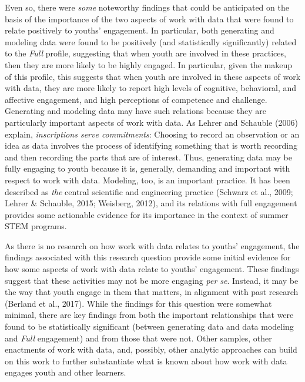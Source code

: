\documentclass[]{book}
\theoremstyle{definition}
\theoremstyle{definition}
\theoremstyle{definition}
\theoremstyle{remark}
\begin{document}
Even so, there were \emph{some} noteworthy findings that could be
anticipated on the basis of the importance of the two aspects of work
with data that were found to relate positively to youths' engagement. In
particular, both generating and modeling data were found to be
positively (and statistically significantly) related to the \emph{Full}
profile, suggesting that when youth are involved in these practices,
then they are more likely to be highly engaged. In particular, given the
makeup of this profile, this suggests that when youth are involved in
these aspects of work with data, they are more likely to report high
levels of cognitive, behavioral, and affective engagement, and high
perceptions of competence and challenge. Generating and modeling data
may have such relations because they are particularly important aspects
of work with data. As Lehrer and Schauble (2006) explain,
\emph{inscriptions serve commitments}: Choosing to record an observation
or an idea as data involves the process of identifying something that is
worth recording and then recording the parts that are of interest. Thus,
generating data may be fully engaging to youth because it is, generally,
demanding and important with respect to work with data. Modeling, too,
is an important practice. It has been described as \emph{the} central
scientific and engineering practice (Schwarz et al., 2009; Lehrer \&
Schauble, 2015; Weisberg, 2012), and its relations with full engagement
provides some actionable evidence for its importance in the context of
summer STEM programs.

As there is no research on how work with data relates to youths'
engagement, the findings associated with this research question provide
some initial evidence for how some aspects of work with data relate to
youths' engagement. These findings suggest that these activities may not
be more engaging \emph{per se}. Instead, it may be the way that youth
engage in them that matters, in alignment with past research (Berland et
al., 2017). While the findings for this question were somewhat minimal,
there are key findings from both the important relationships that were
found to be statistically significant (between generating data and data
modeling and \emph{Full} engagement) and from those that were not. Other
samples, other enactments of work with data, and, possibly, other
analytic approaches can build on this work to further substantiate what
is known about how work with data engages youth and other learners.
\end{document}
